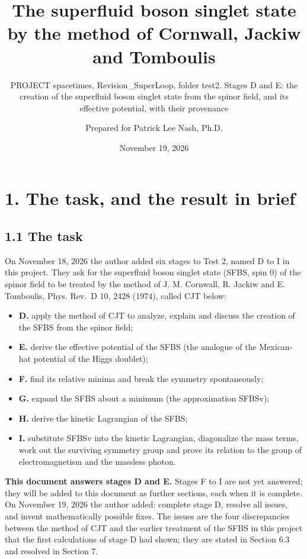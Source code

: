 \documentclass[
  10pt,
]{article}
\title{The superfluid boson singlet state by the method of Cornwall,
Jackiw and Tomboulis}
\subtitle{PROJECT spacetimes, Revision\_SuperLoop, folder test2. Stages
D and E: the creation of the superfluid boson singlet state from the
spinor field, and its effective potential, with their provenance}
\author{Prepared for Patrick Lee Nash, Ph.D.}
\date{November 19, 2026}
\providecommand{\tightlist}{%
  \setlength{\itemsep}{0pt}\setlength{\parskip}{0pt}}
\begin{document}
\maketitle

\hypertarget{the-task-and-the-result-in-brief}{%
\section{1. The task, and the result in
brief}\label{the-task-and-the-result-in-brief}}

\hypertarget{the-task}{%
\subsection{1.1 The task}\label{the-task}}

On November 18, 2026 the author added six stages to Test 2, named D to I
in this project. They ask for the superfluid boson singlet state (SFBS,
spin 0) of the spinor field to be treated by the method of J. M.
Cornwall, R. Jackiw and E. Tomboulis, Phys. Rev.~D 10, 2428 (1974),
called CJT below:

\begin{itemize}
\tightlist
\item
  \textbf{D.} apply the method of CJT to analyze, explain and discuss
  the creation of the SFBS from the spinor field;
\item
  \textbf{E.} derive the effective potential of the SFBS (the analogue
  of the Mexican-hat potential of the Higgs doublet);
\item
  \textbf{F.} find its relative minima and break the symmetry
  spontaneously;
\item
  \textbf{G.} expand the SFBS about a minimum (the approximation SFBSv);
\item
  \textbf{H.} derive the kinetic Lagrangian of the SFBS;
\item
  \textbf{I.} substitute SFBSv into the kinetic Lagrangian, diagonalize
  the mass terms, work out the surviving symmetry group and prove its
  relation to the group of electromagnetism and the massless photon.
\end{itemize}

\textbf{This document answers stages D and E.} Stages F to I are not yet
answered; they will be added to this document as further sections, each
when it is complete. On November 19, 2026 the author added: complete
stage D, resolve all issues, and invent mathematically possible fixes.
The issues are the four discrepancies between the method of CJT and the
earlier treatment of the SFBS in this project that the first
calculations of stage D had shown; they are stated in Section 6.3 and
resolved in Section 7.
\end{document}
